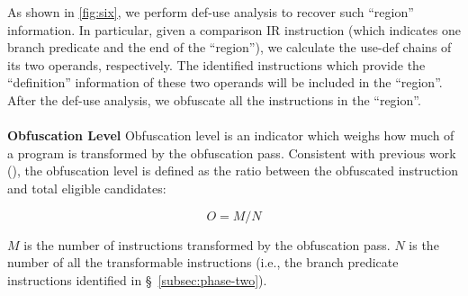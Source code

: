 As shown in \F\ref{fig:six}, we perform def-use analysis to recover such
``region'' information. In particular, given a comparison IR instruction (which
indicates one branch predicate and the end of the ``region''), we calculate the
use-def chains of its two operands, respectively. The identified instructions
which provide the ``definition'' information of these two operands will be
included in the ``region''. After the def-use analysis, we obfuscate all the
instructions in the ``region''.
\\\\
\noindent \textbf{Obfuscation Level} Obfuscation level is an indicator which
weighs how much of a program is transformed by the obfuscation pass. Consistent
with previous work (\cite{Trans}), the obfuscation level is defined as the ratio
between the obfuscated instruction and total eligible candidates:

\[ O = M / N \]

\(M\) is the number of instructions transformed by the obfuscation pass. \(N\)
is the number of all the transformable instructions (i.e., the branch predicate
instructions identified in \S~\ref{subsec:phase-two}).
